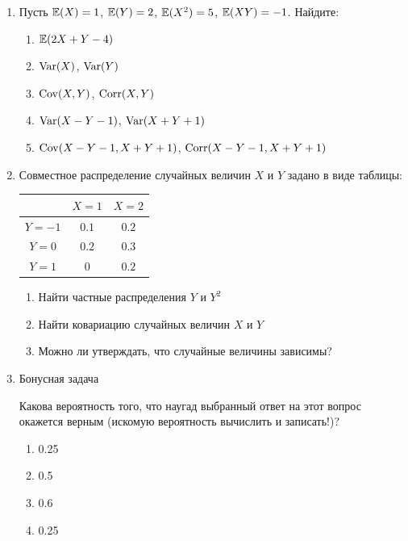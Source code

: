 \documentclass[12pt, a4paper]{article}\usepackage[]{graphicx}\usepackage[]{color}
\begin{document}
\begin{enumerate}
\item Пусть $\mathbb{E}(X) = 1$, $\mathbb{E}(Y) = 2$, $\mathbb{E}(X^2) = 5$, $\mathbb{E}(XY) = -1$. Найдите:
\begin{enumerate}
\item $\mathbb{E}(2X + Y - 4)$
\item $\operatorname{Var}(X)$, $\operatorname{Var}(Y)$
\item $\operatorname{Cov}(X,Y)$, $\operatorname{Corr}(X,Y)$
\item $\operatorname{Var}(X-Y-1)$,  $\operatorname{Var}(X+Y+1)$
\item $\operatorname{Cov}(X-Y-1, X+Y+1)$,  $\operatorname{Corr}(X-Y-1, X+Y+1)$
\end{enumerate}

\item Совместное распределение случайных величин $X$ и $Y$ задано в виде таблицы:

\begin{tabular}{c|cc}
\toprule
 & $X=1$ & $X=2$ \\ \midrule
$Y=-1$ & $0.1$ & $0.2$ \\
$Y=0$ & $0.2$ & $0.3$ \\
$Y=1$ & $0$ & $0.2$ \\ \bottomrule
\end{tabular}

\begin{enumerate}
\item Найти частные распределения $Y$ и $Y^2$
\item Найти ковариацию случайных величин $X$ и $Y$
\item Можно ли утверждать, что случайные величины зависимы?
\end{enumerate}

\item Бонусная задача

Какова вероятность того, что наугад выбранный ответ на этот вопрос окажется верным (искомую вероятность вычислить и записать!)?
\begin{enumerate}
\item 0.25
\item 0.5
\item 0.6
\item 0.25
\end{enumerate}

\end{enumerate}
\end{document}
